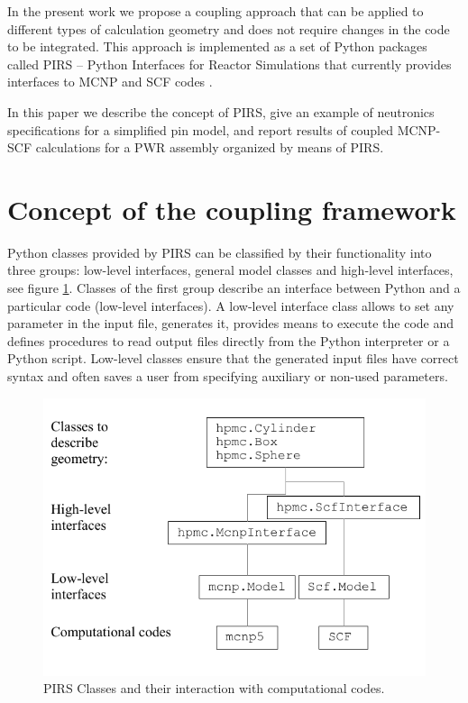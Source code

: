 \documentclass[a4paper,10pt,twocolumn,english]{sphinxsnamc2013}
\begin{document}
In the present work we propose a coupling approach that can be applied to
different types of calculation geometry and does not require changes in the
code to be integrated. This approach is implemented as a set of Python
\cite{pythonWEB} packages called PIRS -- Python Interfaces for
Reactor Simulations that currently provides interfaces to MCNP
\cite{mcnpREF} and SCF codes \cite{scfREF}.

In this paper we describe  the concept of PIRS, give an example of neutronics
specifications for a simplified pin model, and report results of coupled
MCNP-SCF calculations for a PWR assembly organized by means of PIRS.


\section{Concept of the coupling framework}
\label{paper:concept-of-the-coupling-framework}
Python classes provided by PIRS can be classified by their functionality into
three groups: low-level interfaces, general model classes and high-level
interfaces, see figure \ref{pic:classes}.  Classes of the first
group describe an interface between Python and a particular code (low-level
interfaces). A low-level interface class allows to set any parameter in the
input file, generates it, provides means to execute the code and defines
procedures to read output files directly from the Python interpreter or a
Python script. Low-level classes ensure that the generated input files have
correct syntax and often saves a user from specifying auxiliary or non-used
parameters.
\begin{figure}[htbp]
\centering
\capstart

\includegraphics{scheme_en.pdf}
\caption{PIRS Classes and their interaction with computational codes. \label{pic:classes}}\end{figure}
\end{document}
